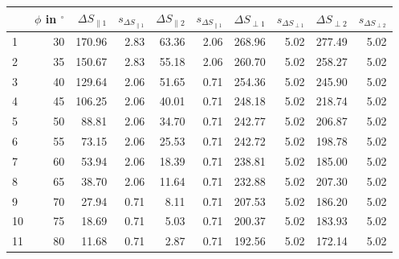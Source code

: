 \begin{table}[ht]
    \centering
    \captionsetup{justification=centering,margin=2cm}
    \begin{tabular}{lrrrrrrrrr}
        \toprule
        {} &  $\phi$ in $^{\circ}$   &  $\Delta S_{\parallel 1}$ &  $s_{\Delta S_{\parallel 1}}$ &  $\Delta S_{\parallel 2}$ &  $s_{\Delta S_{\parallel 1}}$ &  $\Delta S_{\perp  1}$ &  $s_{\Delta S_{\perp  1}}$ & $\Delta S_{\perp  2}$ &   $s_{\Delta S_{\perp 2}}$ \\
        \midrule
        1  &        30 &        170.96 &            2.83 &         63.36 &            2.06 &        268.96 &            5.02 &        277.49 &            5.02 \\
    2  &        35 &        150.67 &            2.83 &         55.18 &            2.06 &        260.70 &            5.02 &        258.27 &            5.02 \\
    3  &        40 &        129.64 &            2.06 &         51.65 &            0.71 &        254.36 &            5.02 &        245.90 &            5.02 \\
    4  &        45 &        106.25 &            2.06 &         40.01 &            0.71 &        248.18 &            5.02 &        218.74 &            5.02 \\
    5  &        50 &         88.81 &            2.06 &         34.70 &            0.71 &        242.77 &            5.02 &        206.87 &            5.02 \\
    6  &        55 &         73.15 &            2.06 &         25.53 &            0.71 &        242.72 &            5.02 &        198.78 &            5.02 \\
    7  &        60 &         53.94 &            2.06 &         18.39 &            0.71 &        238.81 &            5.02 &        185.00 &            5.02 \\
    8  &        65 &         38.70 &            2.06 &         11.64 &            0.71 &        232.88 &            5.02 &        207.30 &            5.02 \\
    9  &        70 &         27.94 &            0.71 &          8.11 &            0.71 &        207.53 &            5.02 &        186.20 &            5.02 \\
    10 &        75 &         18.69 &            0.71 &          5.03 &            0.71 &        200.37 &            5.02 &        183.93 &            5.02 \\
    11 &        80 &         11.68 &            0.71 &          2.87 &            0.71 &        192.56 &            5.02 &        172.14 &            5.02 \\

\end{tabular}
\end{table}
